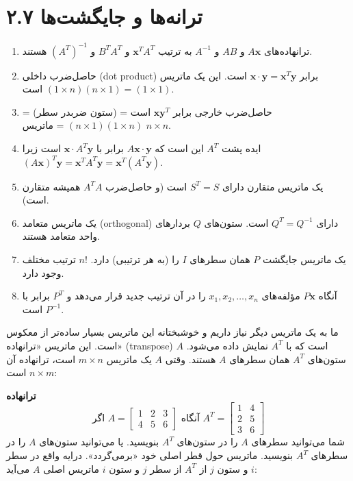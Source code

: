 \documentclass[12pt, a4paper]{book}
\begin{document}
	
	\onehalfspacing
	
	\section*{۲.۷ ترانه‌ها و جایگشت‌ها}
	
	\begin{enumerate}
		\item ترانهاده‌های $A\mathbf{x}$ و $AB$ و $A^{-1}$ به ترتیب $\mathbf{x}^T A^T$ و $B^T A^T$ و $(A^T)^{-1}$ هستند.
		\item حاصل‌ضرب داخلی (dot product) برابر $\mathbf{x} \cdot \mathbf{y} = \mathbf{x}^T\mathbf{y}$ است. این یک ماتریس $(1 \times n)(n \times 1) = (1 \times 1)$ است.
		\item حاصل‌ضرب خارجی برابر $\mathbf{xy}^T$ است = (ستون ضربدر سطر) = $(n \times 1)(1 \times n)$ = ماتریس $n \times n$.
		\item ایده پشت $A^T$ این است که $A\mathbf{x} \cdot \mathbf{y}$ برابر با $\mathbf{x} \cdot A^T\mathbf{y}$ است زیرا $(A\mathbf{x})^T\mathbf{y} = \mathbf{x}^TA^T\mathbf{y} = \mathbf{x}^T(A^T\mathbf{y})$.
		\item یک ماتریس متقارن دارای $S^T=S$ است (و حاصل‌ضرب $A^TA$ همیشه متقارن است).
		\item یک ماتریس متعامد (orthogonal) دارای $Q^T=Q^{-1}$ است. ستون‌های $Q$ بردارهای واحد متعامد هستند.
		\item یک ماتریس جایگشت $P$ همان سطرهای $I$ را (به هر ترتیبی) دارد. $n!$ ترتیب مختلف وجود دارد.
		\item آنگاه $P\mathbf{x}$ مؤلفه‌های $x_1, x_2, \dots, x_n$ را در آن ترتیب جدید قرار می‌دهد و $P^T$ برابر با $P^{-1}$ است.
	\end{enumerate}
	
	ما به یک ماتریس دیگر نیاز داریم و خوشبختانه این ماتریس بسیار ساده‌تر از معکوس است. این ماتریس «ترانهاده» (transpose) $A$ است که با $A^T$ نمایش داده می‌شود. ستون‌های $A^T$ همان سطرهای $A$ هستند.
	وقتی $A$ یک ماتریس $m \times n$ است، ترانهاده آن $n \times m$ است:
	
	\textbf{ترانهاده}
	\[ \text{اگر } A = \begin{bmatrix} 1 & 2 & 3 \\ 4 & 5 & 6 \end{bmatrix} \text{ آنگاه } A^T = \begin{bmatrix} 1 & 4 \\ 2 & 5 \\ 3 & 6 \end{bmatrix} \]
	شما می‌توانید سطرهای $A$ را در ستون‌های $A^T$ بنویسید. یا می‌توانید ستون‌های $A$ را در سطرهای $A^T$ بنویسید. ماتریس حول قطر اصلی خود «برمی‌گردد». درایه واقع در سطر $i$ و ستون $j$ از $A^T$ از سطر $j$ و ستون $i$ ماتریس اصلی $A$ می‌آید:
	
\end{document}
